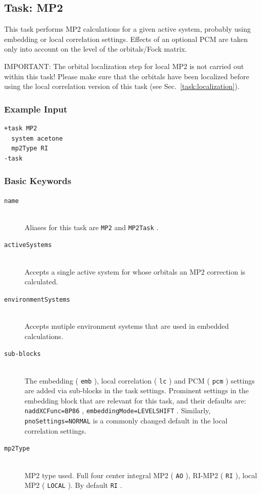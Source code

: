 \documentclass[bibliography=totocnumbered,a4paper,10pt,oneside]{scrbook}
\newcommand{\ttt}[1]{%
  \begingroup\setlength{\fboxsep}{1pt}%
  \colorbox{serenity-green!30}{\texttt{\hspace*{2pt}\vphantom{(g}#1\hspace*{2pt}}}%
  \endgroup
}
\begin{document}
\clearpage
\subsection{Task: MP2}\label{task: mp2}
\label{sec:MP2}
This task performs MP2 calculations for a given active system, probably using embedding or local correlation
settings. Effects of an optional PCM are taken only into account on the level of the orbitals/Fock matrix.

{\color{red}IMPORTANT:} The orbital localization step for local MP2 is not carried out
within this task! Please make sure that the orbitals have been localized before using the local
correlation version of this task (see Sec.~\ref{task:localization}).
\subsubsection{Example Input}
\begin{lstlisting}
+task MP2
  system acetone
  mp2Type RI
-task
\end{lstlisting}
\subsubsection{Basic Keywords}
\begin{description}
	\item [\texttt{name}]\hfill \\
	Aliases for this task are \ttt{MP2} and \ttt{MP2Task}.
	\item [\texttt{activeSystems}]\hfill \\
	Accepts a single active system for whose orbitals an MP2 correction is calculated.
	\item [\texttt{environmentSystems}]\hfill \\
	Accepts mutiple environment systems that are used in embedded calculations.
	\item [\texttt{sub-blocks}]\hfill \\
	The embedding (\ttt{emb}), local correlation (\ttt{lc}) and PCM (\ttt{pcm}) settings are added via sub-blocks in the task settings.
	Prominent settings in the embedding block that are relevant for this task, and their defaults are:
	\ttt{naddXCFunc=BP86}, \ttt{embeddingMode=LEVELSHIFT}.
	Similarly, \ttt{pnoSettings=NORMAL} is a commonly changed default in the local correlation settings.
	\item [\texttt{mp2Type}] \hfill \\ 
	MP2 type used. Full four center integral MP2 (\ttt{AO}), RI-MP2 (\ttt{RI}), local MP2 (\ttt{LOCAL}). By default \ttt{RI}. 
\end{description}
\end{document}
